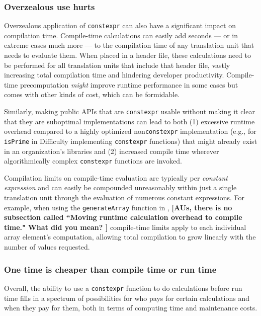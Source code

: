 \subsubsection[Overzealous use hurts]{Overzealous use hurts}\label{overzealous-use-hurts}

Overzealous application of \lstinline!constexpr! can also have a
significant impact on compilation time. Compile-time calculations can
easily add seconds --- or in extreme cases much more --- to the
compilation time of any translation unit that needs to evaluate them.
When placed in a header file, these calculations need to be performed
for all translation units that include that header file, vastly
increasing total compilation time and hindering developer productivity.
Compile-time precomputation \emph{might} improve runtime performance in
some cases but comes with other kinds of cost, which can be formidable.

Similarly, making public APIs that are \lstinline!constexpr! usable without
making it clear that they are suboptimal implementations can lead to
both (1) excessive runtime overhead compared to a highly optimized
non\lstinline!constexpr! implementation (e.g., for \lstinline!isPrime! in
Difficulty implementing \lstinline!constexpr! functions) that
might already exist in an organization's libraries and (2) increased
compile time wherever algorithmically complex \lstinline!constexpr!
functions are invoked.

Compilation limits on compile-time evaluation are typically per
\emph{constant expression} and can easily be compounded unreasonably
within just a single translation unit through the evaluation of numerous
constant expressions. For example, when using the \lstinline!generateArray!
function in , \textbf{[AUs, there is no subsection called ``Moving
runtime calculation overhead to compile time." What did you mean? ]} compile-time limits
apply to each individual array element's computation, allowing total
compilation to grow linearly with the number of values requested.

\subsubsection[One time is cheaper than compile time or run time]{One time is cheaper than compile time or run time}\label{one-time-is-cheaper-than-compile-time-or-run-time}

Overall, the ability to use a \lstinline!constexpr! function to do
calculations before run time fills in a spectrum of possibilities for
who pays for certain calculations and when they pay for them, both in
terms of computing time and maintenance costs.

